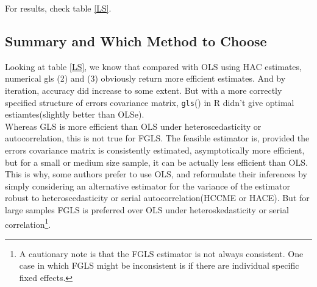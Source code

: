 \documentclass{article}
\theoremstyle{definition}
\begin{document}
For results, check table \ref{LS}.


\subsection{Summary and Which Method to Choose}
Looking at table \ref{LS}, we know that compared with OLS using HAC estimates, numerical gls (2) and (3) obviously return more efficient estimates. And by iteration, accuracy did increase to some extent. But with a more correctly specified structure of errors covariance matrix, \texttt{gls}() in R didn't give optimal estiamtes(slightly better than OLSe).\\[8pt]

Whereas GLS is more efficient than OLS under heteroscedasticity or autocorrelation, this is not true for FGLS. The feasible estimator is, provided the errors covariance matrix is consistently estimated, asymptotically more efficient, but for a small or medium size sample, it can be actually less efficient than OLS. This is why, some authors prefer to use OLS, and reformulate their inferences by simply considering an alternative estimator for the variance of the estimator robust to heteroscedasticity or serial autocorrelation(HCCME or HACE). But for large samples FGLS is preferred over OLS under heteroskedasticity or serial correlation\footnote{A cautionary note is that the FGLS estimator is not always {\color{red} consistent}. One case in which FGLS might be inconsistent is if there are individual specific fixed effects.\cite{Hansen2007}}.
\end{document}
